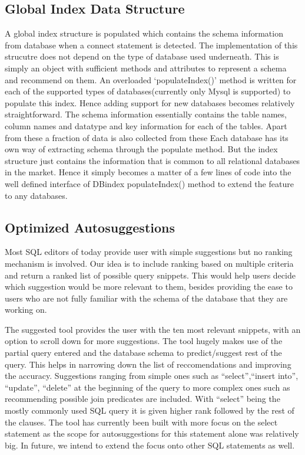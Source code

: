 \documentclass{acm_proc_article-sp}
\begin{document}
\subsection{Global Index Data Structure}
 A global index structure is populated which contains the schema information from database when a connect statement is detected. The implementation of this strucutre does not depend on the type of database used underneath. This is simply an object with sufficient methods and attributes to represent a schema and recommend on them. An overloaded `populateIndex()' method is written for each of the supported types of databases(currently only Mysql is supported) to populate this index. Hence adding support for new databases becomes relatively straightforward. 
The schema information essentially contains the table names, column names and datatype and key information for each of the tables. Apart from these a fraction of data is also collected from these 
Each database has its own way of extracting schema through the populate method. But the index structure just contains the information that is common to all relational databases in the market. Hence it simply becomes a matter of a few lines of code into the well defined interface of DBindex populateIndex() method to extend the feature to any databases.  

\subsection{Optimized Autosuggestions}
Most SQL editors of today provide user with simple suggestions but no ranking mechanism is involved. Our idea is to include ranking based on multiple criteria and return a ranked list of possible query snippets. This would help users decide which suggestion would be more relevant to them, besides providing the ease to users who are not fully familiar with the schema of the database that they are working on.

The suggested tool provides the user with the ten most relevant snippets, with an option to scroll down for more suggestions. The tool hugely makes use of the partial query entered and the database schema to predict/suggest rest of the query. This helps in narrowing down the list of reccomendations and improving the accuracy. Suggestions ranging from simple ones such as ``select'',``insert into'', ``update'', ``delete'' at the beginning of the query to more complex ones such as recommending possible join predicates are included. With ``select'' being the mostly commonly used SQL query it is given higher rank followed by the rest of the clauses. The tool has currently been built with more focus on the select statement as the scope for autosuggestions for this statement alone was relatively big. In future, we intend to extend the focus onto other SQL statements as well.
\end{document}
